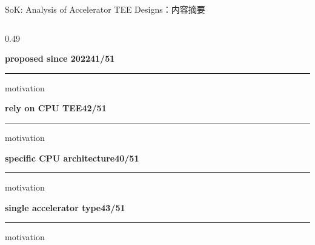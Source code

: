 \begin{frame}[t,shrink=6]{SoK: Analysis of Accelerator TEE Designs：内容摘要}
\begin{columns}[T,totalwidth=\textwidth]
\begin{column}{0.49\textwidth}
{\begin{minipage}[t]{0.97\linewidth}
\begin{minipage}{0.92\linewidth}
\textbf{proposed since 2022}\hfill \textcolor{Accent}{\bfseries 41/51}\par\textcolor{Accent}{\rule{0.80\linewidth}{1.1mm}}\par{\tiny\textcolor{Muted}{motivation}}\par\vspace{0.8mm}
\textbf{rely on CPU TEE}\hfill \textcolor{Accent}{\bfseries 42/51}\par\textcolor{Accent}{\rule{0.82\linewidth}{1.1mm}}\par{\tiny\textcolor{Muted}{motivation}}\par\vspace{0.8mm}
\textbf{specific CPU architecture}\hfill \textcolor{Accent}{\bfseries 40/51}\par\textcolor{Accent}{\rule{0.78\linewidth}{1.1mm}}\par{\tiny\textcolor{Muted}{motivation}}\par\vspace{0.8mm}
\textbf{single accelerator type}\hfill \textcolor{Accent}{\bfseries 43/51}\par\textcolor{Accent}{\rule{0.84\linewidth}{1.1mm}}\par{\tiny\textcolor{Muted}{motivation}}\par\vspace{0.8mm}
    \end{minipage}
    \vspace{1mm}
  \end{minipage}}
  \end{column}
\end{columns}
\end{frame}


